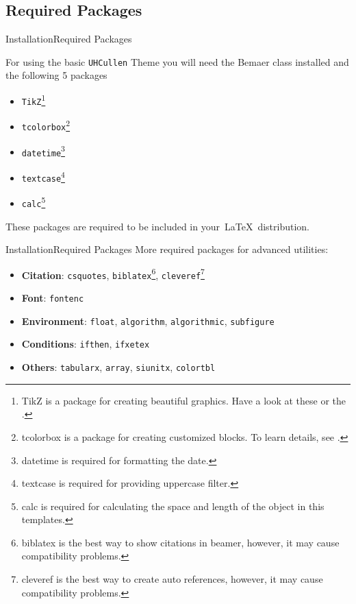 \documentclass[10pt,xcolor={dvipsnames},aspectratio=169]{beamer}
\begin{document}
\subsection{Required Packages}
\begin{frame}{Installation}{Required Packages}

  For using the basic \texttt{UHCullen} Theme you will need the Bemaer class installed and the following 5 packages
  \begin{itemize}
    \item \texttt{TikZ}\footnote{TikZ is a package for creating beautiful graphics. Have a look at these  or the .}
    \item \texttt{tcolorbox}\footnote{tcolorbox is a package for creating customized blocks. To learn details, see .}
    \item \texttt{datetime}\footnote{datetime is required for formatting the date.}
    \item \texttt{textcase}\footnote{textcase is required for providing uppercase filter.}
    \item \texttt{calc}\footnote{calc is required for calculating the space and length of the object in this templates.}
  \end{itemize}
  These packages are required to be included in your~\LaTeX~distribution.
\end{frame}

\begin{frame}{Installation}{Required Packages}
More required packages for advanced utilities:
\begin{itemize}
  \item \textbf{Citation}: \texttt{csquotes}, \texttt{biblatex}\footnote{biblatex is the best way to show citations in beamer, however, it may cause compatibility problems.}, \texttt{cleveref}\footnote{cleveref is the best way to create auto references, however, it may cause compatibility problems.}
  \item \textbf{Font}: \texttt{fontenc}
  \item \textbf{Environment}: \texttt{float}, \texttt{algorithm}, \texttt{algorithmic}, \texttt{subfigure}
  \item \textbf{Conditions}: \texttt{ifthen}, \texttt{ifxetex}
  \item \textbf{Others}: \texttt{tabularx}, \texttt{array}, \texttt{siunitx}, \texttt{colortbl}
\end{itemize}
\end{frame}
\end{document}
